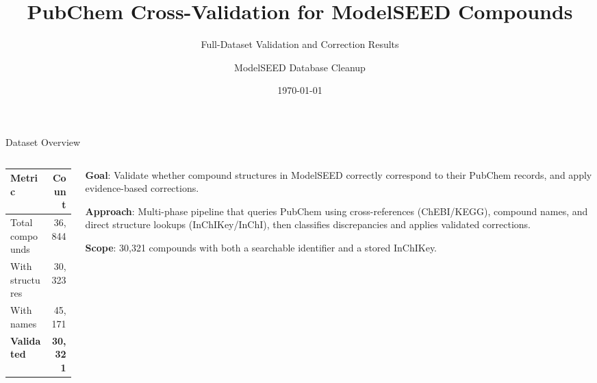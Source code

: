 \documentclass[aspectratio=169,11pt]{beamer}
\title{PubChem Cross-Validation for ModelSEED Compounds}
\subtitle{Full-Dataset Validation and Correction Results}
\author{ModelSEED Database Cleanup}
\date{\today}
\begin{document}
\begin{frame}
\titlepage
\end{frame}


\begin{frame}{Dataset Overview}

\begin{columns}[T]
\begin{column}{0.42\textwidth}
\begin{table}[h]
\centering
\small
\begin{tabular}{lr}
\toprule
\textbf{Metric} & \textbf{Count} \\
\midrule
Total compounds        & 36,844 \\
With structures        & 30,323 \\
With names             & 45,171 \\
\textbf{Validated}     & \textbf{30,321} \\
\bottomrule
\end{tabular}
\end{table}
\end{column}

\begin{column}{0.54\textwidth}
\textbf{Goal}: Validate whether compound structures in ModelSEED
correctly correspond to their PubChem records, and apply
evidence-based corrections.

\medskip
\textbf{Approach}: Multi-phase pipeline that queries PubChem
using cross-references (ChEBI/KEGG), compound names, and
direct structure lookups (InChIKey/InChI), then classifies
discrepancies and applies validated corrections.

\medskip
\textbf{Scope}: 30,321 compounds with both a searchable
identifier and a stored InChIKey.
\end{column}
\end{columns}

\end{frame}

\end{document}
